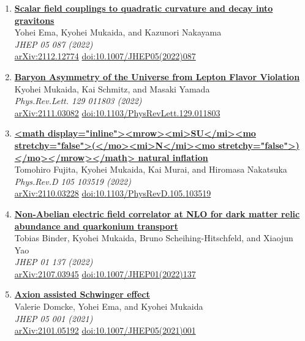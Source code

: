 \begin{enumerate}
\item \textbf{\href{https://arxiv.org/abs/2112.12774}{Scalar field couplings to quadratic curvature and decay into gravitons}}\\
Yohei Ema, Kyohei Mukaida, and Kazunori Nakayama\\
\emph{JHEP 05 087 (2022)}
\\ \href{https://arxiv.org/abs/2112.12774}{arXiv:2112.12774} \href{https://doi.org/10.1007/JHEP05(2022)087}{doi:10.1007/JHEP05(2022)087}

\item \textbf{\href{https://arxiv.org/abs/2111.03082}{Baryon Asymmetry of the Universe from Lepton Flavor Violation}}\\
Kyohei Mukaida, Kai Schmitz, and Masaki Yamada\\
\emph{Phys.Rev.Lett. 129 011803 (2022)}
\\ \href{https://arxiv.org/abs/2111.03082}{arXiv:2111.03082} \href{https://doi.org/10.1103/PhysRevLett.129.011803}{doi:10.1103/PhysRevLett.129.011803}

\item \textbf{\href{https://arxiv.org/abs/2110.03228}{<math display="inline"><mrow><mi>SU</mi><mo stretchy="false">(</mo><mi>N</mi><mo stretchy="false">)</mo></mrow></math> natural inflation}}\\
Tomohiro Fujita, Kyohei Mukaida, Kai Murai, and Hiromasa Nakatsuka\\
\emph{Phys.Rev.D 105 103519 (2022)}
\\ \href{https://arxiv.org/abs/2110.03228}{arXiv:2110.03228} \href{https://doi.org/10.1103/PhysRevD.105.103519}{doi:10.1103/PhysRevD.105.103519}

\item \textbf{\href{https://arxiv.org/abs/2107.03945}{Non-Abelian electric field correlator at NLO for dark matter relic abundance and quarkonium transport}}\\
Tobias Binder, Kyohei Mukaida, Bruno Scheihing-Hitschfeld, and Xiaojun Yao\\
\emph{JHEP 01 137 (2022)}
\\ \href{https://arxiv.org/abs/2107.03945}{arXiv:2107.03945} \href{https://doi.org/10.1007/JHEP01(2022)137}{doi:10.1007/JHEP01(2022)137}

\item \textbf{\href{https://arxiv.org/abs/2101.05192}{Axion assisted Schwinger effect}}\\
Valerie Domcke, Yohei Ema, and Kyohei Mukaida\\
\emph{JHEP 05 001 (2021)}
\\ \href{https://arxiv.org/abs/2101.05192}{arXiv:2101.05192} \href{https://doi.org/10.1007/JHEP05(2021)001}{doi:10.1007/JHEP05(2021)001}


\end{enumerate}
